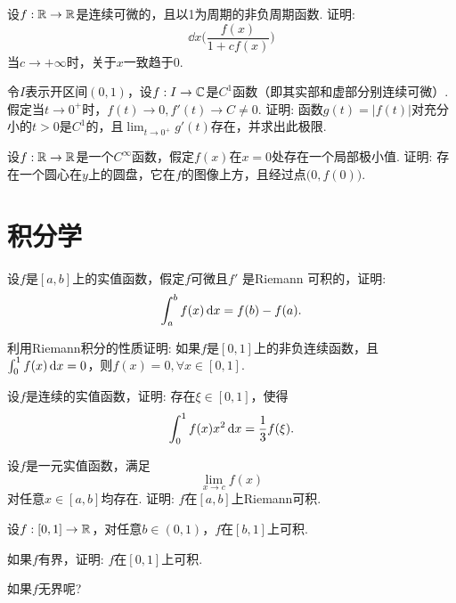 \begin{example}
  设$f:\mathbb R\to\mathbb R$是连续可微的，且以1为周期的非负周期函数. 证明:
  \[ \dd{}x\Big( \frac{f(x)}{1+cf(x)} \Big) \]
  当$c\to+\infty$时，关于$x$一致趋于0.
\end{example}

\begin{example}
  令$I$表示开区间$(0,1)$，设$f:I\to\mathbb C$是$C^1$函数（即其实部和虚部分别连续可微）.假定当$t\to0^+$时，$f(t)\to0,f'(t)\to C\ne0$. 证明: 函数$g(t)=|f(t)|$对充分小的$t>0$是$C^1$的，且$\lim_{t\to0^+}g'(t)$存在，并求出此极限.
\end{example}

\begin{example}
  设$f:\mathbb R\to\mathbb R$是一个$C^\infty$函数，假定$f(x)$在$x=0$处存在一个局部极小值. 证明: 存在一个圆心在$y$上的圆盘，它在$f$的图像上方，且经过点$\big(0,f(0)\big)$.
\end{example}

\section{积分学}
\begin{example}
  设$f$是$[a,b]$上的实值函数，假定$f$可微且$f'$ 是Riemann 可积的，证明:
  \[ \int_a^bf(x)\,\mathrm dx = f(b)-f(a). \]
\end{example}

\begin{example}
  利用Riemann积分的性质证明: 如果$f$是$[0,1]$上的非负连续函数，且$\int_0^1f(x)\,\mathrm dx=0$，则$f(x)=0,\forall x\in[0,1]$.
\end{example}

\begin{example}
  设$f$是连续的实值函数，证明: 存在$\xi\in[0,1]$，使得
  \[ \int_0^1f(x)x^2\,\mathrm dx = \frac13f(\xi). \]
\end{example}

\begin{example}
  设$f$是一元实值函数，满足
  \[ \lim_{x\to c}f(x) \]
  对任意$x\in[a,b]$均存在. 证明: $f$在$[a,b]$上Riemann可积.
\end{example}

\begin{example}
  设$f:[0,1]\to\mathbb R$，对任意$b\in(0,1)$，$f$在$[b,1]$上可积.
  \begin{eenum}
    \item 如果$f$有界，证明: $f$在$[0,1]$上可积.
    \item 如果$f$无界呢?
  \end{eenum}
\end{example}

